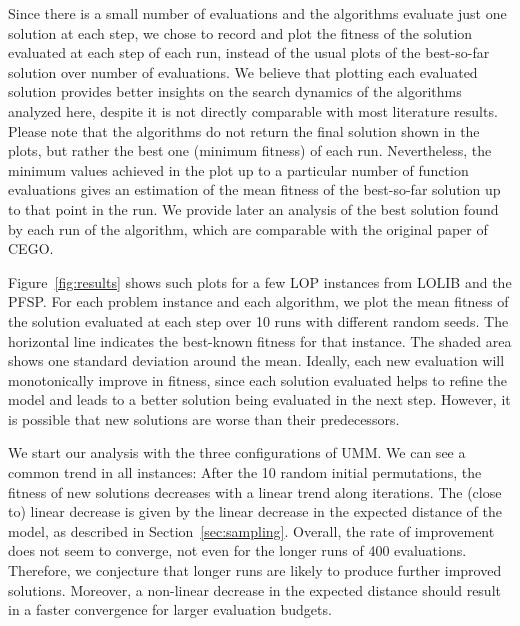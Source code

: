 \documentclass[sigconf,dvipsnames]{acmart}
\begin{document}
Since there is a small number of evaluations and the algorithms evaluate just
one solution at each step, we chose to record and plot the fitness of the
solution evaluated at each step of each run, instead of the usual plots of the
best-so-far solution over number of evaluations. We believe that plotting each
evaluated solution provides better insights on the search dynamics of the
algorithms analyzed here, despite it is not directly comparable with most literature results. Please note that the algorithms do not return the
final solution shown in the plots, but rather the best one (minimum fitness) of
each run. Nevertheless, the minimum values achieved in the plot up to a
particular number of function evaluations gives an estimation of the mean
fitness of the best-so-far solution up to that point in the run. We provide
later an analysis of the best solution found by each run of the algorithm, which are comparable with the original paper of CEGO.

Figure~\ref{fig:results} shows such plots for a few LOP instances from LOLIB
and the PFSP.  For each problem instance and each algorithm, we plot the mean
fitness of the solution evaluated at each step over 10 runs with different
random seeds. The horizontal line indicates the best-known fitness for that instance.
% 
The shaded area shows one standard deviation around the mean. Ideally, each new
evaluation will monotonically improve in fitness, since each solution evaluated
helps to refine the model and leads to a better solution being evaluated in the
next step.  However, it is possible that new solutions are worse than their
predecessors. %

 We start our analysis with the three
configurations of UMM. We can see a common trend in all instances: After
the 10 random initial permutations, the fitness of new solutions decreases
with a linear trend along iterations. The (close to) linear decrease is given
by the linear decrease in the expected distance of the model, as described in Section~\ref{sec:sampling}. Overall, the rate of improvement
does not seem to converge, not even for the longer runs of 400 evaluations. Therefore, we conjecture that longer runs are likely to produce further improved solutions. Moreover, a non-linear decrease in the expected distance should result in a faster convergence for larger evaluation budgets. 
\end{document}

